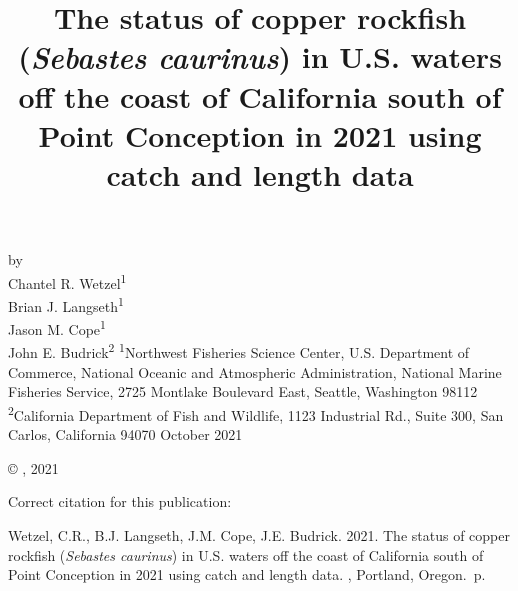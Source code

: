 \documentclass[11pt,
  english,
  a4paper,
]{article}
\date{}
\newcommand{\trTitle}{The status of copper rockfish (\emph{Sebastes caurinus}) in U.S. waters off the coast of California south of Point Conception in 2021 using catch and length data}
\newcommand{\trYear}{2021}
\newcommand{\trMonth}{October}
\newcommand{\trAuthsBack}{Wetzel, C.R., B.J. Langseth, J.M. Cope, J.E. Budrick}
\newcommand{\trCitation}{
\begin{hangparas}{1em}{1}
\trAuthsBack{}. \trYear{}. \trTitle{}. \glsentrylong{pfmc}, Portland, Oregon. \pageref{LastPage}{}\,p.
\end{hangparas}}
\begin{document}

\renewcommand*{\thefootnote}{\fnsymbol{footnote}}

\small
\thispagestyle{empty}
\noindent
\begin{center}
\title{The status of copper rockfish (\emph{Sebastes caurinus}) in U.S. waters off the coast of California south of Point Conception in 2021 using catch and length data}
\vspace{1.5cm}
{\Large\textbf{}}
\vfill
by\\
Chantel R. Wetzel\textsuperscript{1}\\
Brian J. Langseth\textsuperscript{1}\\
Jason M. Cope\textsuperscript{1}\\
John E. Budrick\textsuperscript{2}\vfill
\textsuperscript{1}Northwest Fisheries Science Center, U.S. Department of Commerce, National Oceanic and Atmospheric Administration, National Marine Fisheries Service, 2725 Montlake Boulevard East, Seattle, Washington 98112\\
\textsuperscript{2}California Department of Fish and Wildlife, 1123 Industrial Rd., Suite 300, San Carlos, California 94070\vfill
\trMonth{} \trYear{}
\end{center}
\clearpage

\thispagestyle{empty}
\vspace*{\fill}
\begin{center}
\copyright{} , \trYear{}\\
\end{center}
\par
\bigskip
\noindent
Correct citation for this publication:
\bigskip
\par
\trCitation{}
\clearpage


\tableofcontents\clearpage
\label{TRlastRoman}
\clearpage

\newpage
\thispagestyle{empty} %

\pagestyle{plain}  %
\renewcommand*{\thefootnote}{\arabic{footnote}}  %
\setcounter{footnote}{0}  %
\renewcommand{\headrulewidth}{0.5pt}
\renewcommand{\footrulewidth}{0.5pt}
\end{document}
